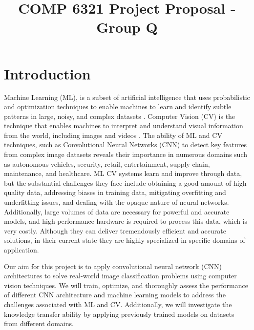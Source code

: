 \documentclass[10pt,twocolumn,letterpaper]{article}
\begin{document}
\title{COMP 6321 Project Proposal - Group Q}  %

\maketitle
\thispagestyle{empty}
\appendix

\section{Introduction}
Machine Learning (ML), is a subset of artificial intelligence that uses probabilistic and optimization techniques to enable machines to learn and identify subtle patterns in large, noisy, and complex datasets \cite{zhou2021machine}. Computer Vision (CV) is the technique that enables machines to interpret and understand visual information from the world, including images and videos \cite{klette2014concise}. The ability of ML and CV techniques, such as Convolutional Neural Networks (CNN) to detect key features from complex image datasets reveals their importance in numerous domains such as autonomous vehicles, security, retail, entertainment, supply chain, maintenance, and healthcare. ML CV systems learn and improve through data, but the substantial challenges they face include obtaining a good amount of high-quality data, addressing biases in training data, mitigating overfitting and underfitting issues, and dealing with the opaque nature of neural networks. Additionally, large volumes of data are necessary for powerful and accurate models, and high-performance hardware is required to process this data, which is very costly. Although they can deliver tremendously efficient and accurate solutions, in their current state they are highly specialized in specific domains of application.

Our aim for this project is to apply convolutional neural network (CNN) architectures to solve real-world image classification problems using computer vision techniques. We will train, optimize, and thoroughly assess the performance of different CNN architecture and machine learning models to address the challenges associated with ML and CV. Additionally, we will investigate the knowledge transfer ability by applying previously trained models on datasets from different domains.


\end{document}
